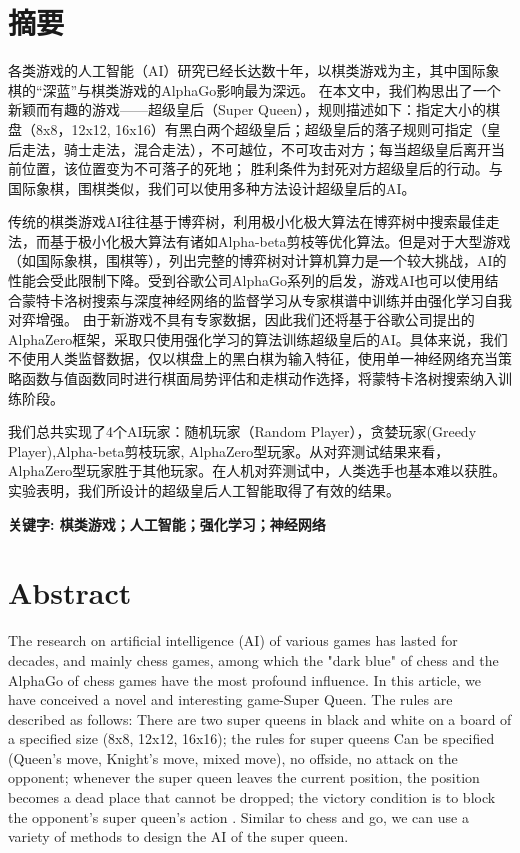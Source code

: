 \chapter*{摘要}

各类游戏的人工智能（AI）研究已经长达数十年，以棋类游戏为主，其中国际象棋的“深蓝”与棋类游戏的AlphaGo影响最为深远。
在本文中，我们构思出了一个新颖而有趣的游戏——超级皇后（Super Queen），规则描述如下：指定大小的棋盘（8x8，12x12, 16x16）有黑白两个超级皇后；超级皇后的落子规则可指定（皇后走法，骑士走法，混合走法），不可越位，不可攻击对方；每当超级皇后离开当前位置，该位置变为不可落子的死地；
胜利条件为封死对方超级皇后的行动。与国际象棋，围棋类似，我们可以使用多种方法设计超级皇后的AI。


传统的棋类游戏AI往往基于博弈树，利用极小化极大算法在博弈树中搜索最佳走法，而基于极小化极大算法有诸如Alpha-beta剪枝等优化算法。但是对于大型游戏（如国际象棋，围棋等），列出完整的博弈树对计算机算力是一个较大挑战，AI的性能会受此限制下降。受到谷歌公司AlphaGo系列的启发，游戏AI也可以使用结合蒙特卡洛树搜索与深度神经网络的监督学习从专家棋谱中训练并由强化学习自我对弈增强。
由于新游戏不具有专家数据，因此我们还将基于谷歌公司提出的AlphaZero框架，采取只使用强化学习的算法训练超级皇后的AI。具体来说，我们不使用人类监督数据，仅以棋盘上的黑白棋为输入特征，使用单一神经网络充当策略函数与值函数同时进行棋面局势评估和走棋动作选择，将蒙特卡洛树搜索纳入训练阶段。


我们总共实现了4个AI玩家：随机玩家（Random Player），贪婪玩家(Greedy Player),Alpha-beta剪枝玩家, AlphaZero型玩家。从对弈测试结果来看，AlphaZero型玩家胜于其他玩家。在人机对弈测试中，人类选手也基本难以获胜。实验表明，我们所设计的超级皇后人工智能取得了有效的结果。

\noindent\textbf{关键字: 棋类游戏；人工智能；强化学习；神经网络}
\chapter*{Abstract}

The research on artificial intelligence (AI) of various games has lasted for decades, and mainly chess games, among which the "dark blue" of chess and the AlphaGo of chess games have the most profound influence.
In this article, we have conceived a novel and interesting game-Super Queen. The rules are described as follows: There are two super queens in black and white on a board of a specified size (8x8, 12x12, 16x16); the rules for super queens Can be specified (Queen's move, Knight's move, mixed move), no offside, no attack on the opponent; whenever the super queen leaves the current position, the position becomes a dead place that cannot be dropped; the victory condition is to block the opponent's super queen's action . Similar to chess and go, we can use a variety of methods to design the AI ​​of the super queen.


